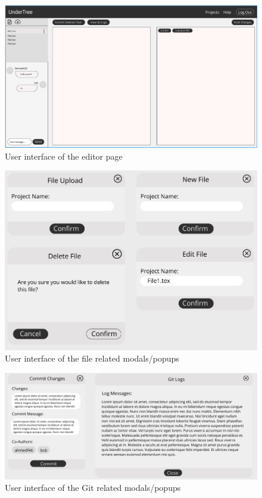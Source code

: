 \documentclass[12pt, titlepage]{article}
\begin{document}
	\begin{figure}[H]
		\centering
		\includegraphics[width=\linewidth]{editorPage.png}
		\caption{User interface of the editor page}
	\end{figure}
	
	\begin{figure}[H]
		\centering
		\includegraphics[width=\linewidth]{fileModals.png}
		\caption{User interface of the file related modals/popups}
	\end{figure}
	
	\begin{figure}[H]
		\centering
		\includegraphics[width=\linewidth]{gitModals.png}
		\caption{User interface of the Git related modals/popups}
	\end{figure}
	
\end{document}
